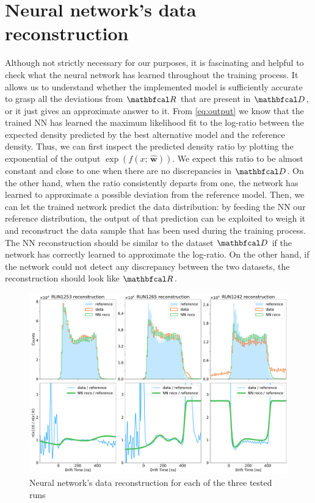 \section{Neural network's data reconstruction}\label{sec:nnreco}

Although not strictly necessary for our purposes, it is fascinating and helpful to check what the neural network has
learned throughout the training process. It allows us to understand whether the implemented model is sufficiently
accurate to grasp all the deviations from $\R$ that are present in $\D$, or it just gives an approximate answer to it.
From \autoref{eq:output} we know that the trained NN has learned the maximum likelihood fit to the log-ratio between the
expected density predicted by the best alternative model and the reference density. Thus, we can first inspect the
predicted density ratio by plotting the exponential of the output $\exp(f(x;\,\widehat{\mathbf{w}}))$. We expect this
ratio to be almost constant and close to one when there are no discrepancies in $\D$. On the other hand, when the ratio
consistently departs from one, the network has learned to approximate a possible deviation from the reference model.
Then, we can let the trained network predict the data distribution: by feeding the NN our reference distribution, the
output of that prediction can be exploited to weigh it and reconstruct the data sample that has been used during the
training process. The NN reconstruction should be similar to the dataset $\D$ if the network has correctly learned to
approximate the log-ratio. On the other hand, if the network could not detect any discrepancy between the two datasets,
the reconstruction should look like $\R$. 

\begin{figure}[h]
    \centering
    \includegraphics[width=1.0\textwidth]{../FALKON/plots/nn_reco.pdf}
    \caption{Neural network's data reconstruction for each of the three tested runs}
    \label{fig:reco}
\end{figure}

